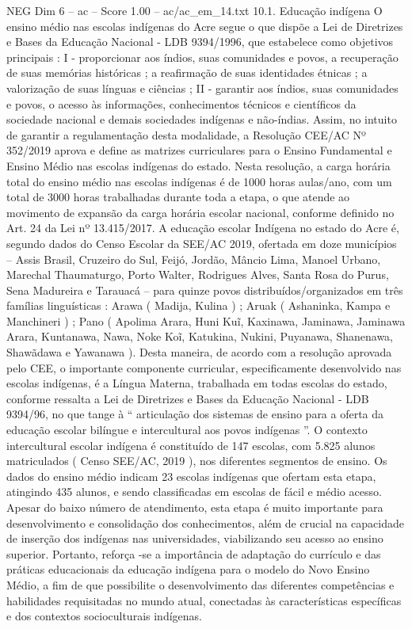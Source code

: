 \begin{textsample}{NEG Dim 6 – ac – Score 1.00 – ac/ac\_em\_14.txt}  \label{ex:f6_neg_137}
10.1.
Educação indígena O ensino médio nas escolas indígenas do Acre segue o que dispõe a Lei de Diretrizes e Bases da Educação Nacional - LDB 9394/1996, que estabelece como objetivos principais : I - proporcionar aos índios, suas comunidades e povos, a recuperação de suas memórias históricas ; a reafirmação de suas identidades étnicas ; a valorização de suas línguas e ciências ; II - garantir aos índios, suas comunidades e povos, o acesso às informações, conhecimentos técnicos e científicos da sociedade nacional e demais sociedades indígenas e não-índias.
Assim, no intuito de garantir a regulamentação desta modalidade, a Resolução CEE/AC Nº 352/2019 aprova e define as matrizes curriculares para o Ensino Fundamental e Ensino Médio nas escolas indígenas do estado.
Nesta resolução, a carga horária total do ensino médio nas escolas indígenas é de 1000 horas aulas/ano, com um total de 3000 horas trabalhadas durante toda a etapa, o que atende ao movimento de expansão da carga horária escolar nacional, conforme definido no Art. 24 da Lei nº 13.415/2017.
A educação escolar Indígena no estado do Acre é, segundo dados do Censo Escolar da SEE/AC 2019, ofertada em doze municípios – Assis Brasil, Cruzeiro do Sul, Feijó, Jordão, Mâncio Lima, Manoel Urbano, Marechal Thaumaturgo, Porto Walter, Rodrigues Alves, Santa Rosa do Purus, Sena Madureira e Tarauacá – para quinze povos distribuídos/organizados em três famílias linguísticas : Arawa ( Madija, Kulina ) ; Aruak ( Ashaninka, Kampa e Manchineri ) ; Pano ( Apolima Arara, Huni Kuĩ, Kaxinawa, Jaminawa, Jaminawa Arara, Kuntanawa, Nawa, Noke Koĩ, Katukina, Nukini, Puyanawa, Shanenawa, Shawãdawa e Yawanawa ).
Desta maneira, de acordo com a resolução aprovada pelo CEE, o importante componente curricular, especificamente desenvolvido nas escolas indígenas, é a Língua Materna, trabalhada em todas escolas do estado, conforme ressalta a Lei de Diretrizes e Bases da Educação Nacional - LDB 9394/96, no que tange à “ articulação dos sistemas de ensino para a oferta da educação escolar bilíngue e intercultural aos povos indígenas ”.
O contexto intercultural escolar indígena é constituído de 147 escolas, com 5.825 alunos matriculados ( Censo SEE/AC, 2019 ), nos diferentes segmentos de ensino.
Os dados do ensino médio indicam 23 escolas indígenas que ofertam esta etapa, atingindo 435 alunos, e sendo classificadas em escolas de fácil e médio acesso.
Apesar do baixo número de atendimento, esta etapa é muito importante para desenvolvimento e consolidação dos conhecimentos, além de crucial na capacidade de inserção dos indígenas nas universidades, viabilizando seu acesso ao ensino superior.
Portanto, reforça -se a importância de adaptação do currículo e das práticas educacionais da educação indígena para o modelo do Novo Ensino Médio, a fim de que possibilite o desenvolvimento das diferentes competências e habilidades requisitadas no mundo atual, conectadas às características específicas e dos contextos socioculturais indígenas.

\end{textsample}
